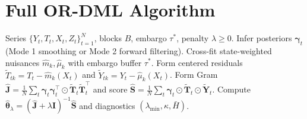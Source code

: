 \documentclass[twoside]{article}
\theoremstyle{definition}
\begin{document}
\section{Full OR-DML Algorithm}
\label{app:algorithm_full}
\begin{algorithm}[t]
\caption{Overlap-Aware Regime DML (OR-DML)}
\label{alg:purged_cv}
\begin{algorithmic}[1]
\REQUIRE Series $\{Y_t, T_t, X_t, Z_t\}_{t=1}^N$, blocks $B$, embargo $\tau^*$, penalty $\lambda \ge 0$.
\STATE Infer posteriors $\boldsymbol{\gamma}_t$ (Mode 1 smoothing or Mode 2 forward filtering).
\STATE Cross-fit state-weighted nuisances $\hat{m}_k, \hat{\mu}_k$ with embargo buffer $\tau^*$.
\STATE Form centered residuals $\tilde{T}_{tk} = T_t - \hat{m}_k(X_t)$ and $\tilde{Y}_{tk} = Y_t - \hat{\mu}_k(X_t)$.
\STATE Form Gram $\hat{\boldsymbol{J}} = \frac{1}{N}\sum_t \boldsymbol{\gamma}_t\boldsymbol{\gamma}_t^\top \odot \tilde{\boldsymbol{T}}_t\tilde{\boldsymbol{T}}_t^\top$ and score $\hat{\boldsymbol{S}} = \frac{1}{N}\sum_t \boldsymbol{\gamma}_t \odot \tilde{\boldsymbol{T}}_t \odot \tilde{\boldsymbol{Y}}_t$.
\STATE Compute $\hat{\boldsymbol{\theta}}_\lambda = (\hat{\boldsymbol{J}} + \lambda \boldsymbol{I})^{-1}\hat{\boldsymbol{S}}$ and diagnostics $(\lambda_{\min}, \kappa, \bar{H})$.
\end{algorithmic}
\end{algorithm}
\end{document}
